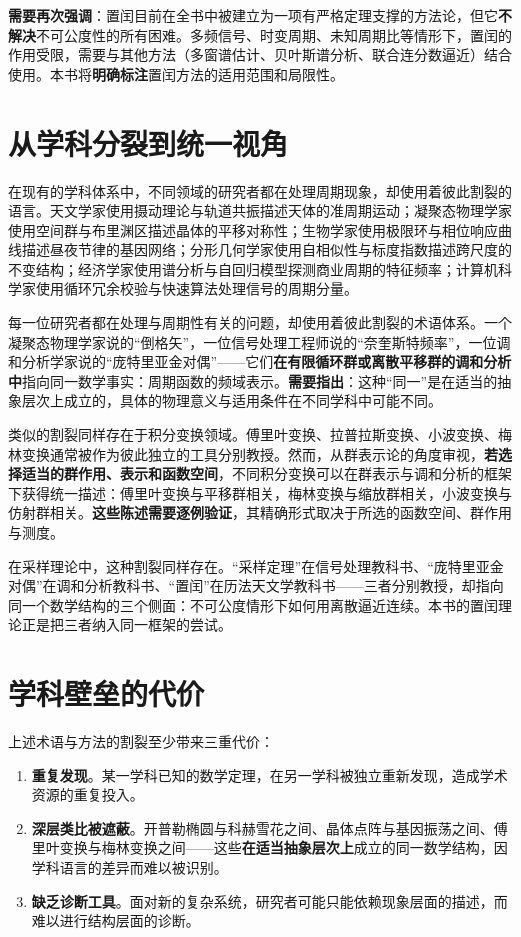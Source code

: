 \textbf{需要再次强调}：置闰目前在全书中被建立为一项有严格定理支撑的方法论，但它\textbf{不解决}不可公度性的所有困难。多频信号、时变周期、未知周期比等情形下，置闰的作用受限，需要与其他方法（多窗谱估计、贝叶斯谱分析、联合连分数逼近）结合使用。本书将\textbf{明确标注}置闰方法的适用范围和局限性。

\section*{从学科分裂到统一视角}

在现有的学科体系中，不同领域的研究者都在处理周期现象，却使用着彼此割裂的语言。天文学家使用摄动理论与轨道共振描述天体的准周期运动；凝聚态物理学家使用空间群与布里渊区描述晶体的平移对称性；生物学家使用极限环与相位响应曲线描述昼夜节律的基因网络；分形几何学家使用自相似性与标度指数描述跨尺度的不变结构；经济学家使用谱分析与自回归模型探测商业周期的特征频率；计算机科学家使用循环冗余校验与快速算法处理信号的周期分量。

每一位研究者都在处理与周期性有关的问题，却使用着彼此割裂的术语体系。一个凝聚态物理学家说的“倒格矢”，一位信号处理工程师说的“奈奎斯特频率”，一位调和分析学家说的“庞特里亚金对偶”——它们\textbf{在有限循环群或离散平移群的调和分析中}指向同一数学事实：周期函数的频域表示。\textbf{需要指出}：这种“同一”是在适当的抽象层次上成立的，具体的物理意义与适用条件在不同学科中可能不同。

类似的割裂同样存在于积分变换领域。傅里叶变换、拉普拉斯变换、小波变换、梅林变换通常被作为彼此独立的工具分别教授。然而，从群表示论的角度审视，\textbf{若选择适当的群作用、表示和函数空间}，不同积分变换可以在群表示与调和分析的框架下获得统一描述：傅里叶变换与平移群相关，梅林变换与缩放群相关，小波变换与仿射群相关。\textbf{这些陈述需要逐例验证}，其精确形式取决于所选的函数空间、群作用与测度。

在采样理论中，这种割裂同样存在。“采样定理”在信号处理教科书、“庞特里亚金对偶”在调和分析教科书、“置闰”在历法天文学教科书——三者分别教授，却指向同一个数学结构的三个侧面：不可公度情形下如何用离散逼近连续。本书的置闰理论正是把三者纳入同一框架的尝试。

\section*{学科壁垒的代价}

上述术语与方法的割裂至少带来三重代价：

\begin{enumerate}[leftmargin=2em, label={(\arabic*)}]
    \item \textbf{重复发现}。某一学科已知的数学定理，在另一学科被独立重新发现，造成学术资源的重复投入。
    \item \textbf{深层类比被遮蔽}。开普勒椭圆与科赫雪花之间、晶体点阵与基因振荡之间、傅里叶变换与梅林变换之间——这些\textbf{在适当抽象层次上}成立的同一数学结构，因学科语言的差异而难以被识别。
    \item \textbf{缺乏诊断工具}。面对新的复杂系统，研究者可能只能依赖现象层面的描述，而难以进行结构层面的诊断。
\end{enumerate}

